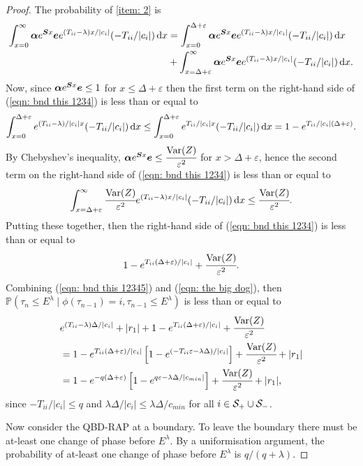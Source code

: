 \begin{proof}
	The probability of \ref{item: 2} is 
	\begin{align}
		\nonumber\int_{x=0}^\infty \boldsymbol \alpha e^{\boldsymbol{S}x}\boldsymbol e e^{(T_{ii}-\lambda)x/|c_i|}(-T_{ii}/|c_i|)\, \mathrm{d} x 
		&= \int_{x=0}^{\Delta+\varepsilon} \boldsymbol \alpha e^{\boldsymbol{S}x}\boldsymbol ee^{(T_{ii}-\lambda)x/|c_i|}(-T_{ii}/|c_i|)\, \mathrm{d} x 
		\\&{}+\int_{x=\Delta+\varepsilon}^\infty \boldsymbol \alpha e^{\boldsymbol{S}x}\boldsymbol e e^{(T_{ii}-\lambda)x/|c_i|}(-T_{ii}/|c_i|)\, \mathrm{d} x.\label{eqn: bnd this 1234}
	\end{align}
	Now, since \(\boldsymbol \alpha e^{\boldsymbol{S}x}\boldsymbol e\leq 1\) for \(x\leq \Delta+\varepsilon\) then the first term on the right-hand side of (\ref{eqn: bnd this 1234}) is less than or equal to 
	\[\displaystyle \int_{x=0}^{\Delta+\varepsilon} e^{(T_{ii}-\lambda)/|c_i|x}(-T_{ii}/|c_i|)\, \mathrm{d} x \leq \int_{x=0}^{\Delta+\varepsilon} e^{T_{ii}/|c_i|x}(-T_{ii}/|c_i|)\, \mathrm{d} x = 1-e^{T_{ii}/|c_i|(\Delta+\varepsilon)}.\]
	By Chebyshev's inequality, \(\boldsymbol \alpha e^{\boldsymbol{S}x}\boldsymbol e\leq \cfrac{\mathrm{Var}(Z)}{\varepsilon^2}\) for \(x> \Delta+\varepsilon\), hence the second term on the right-hand side of (\ref{eqn: bnd this 1234}) is less than or equal to 
	\[\displaystyle \int_{x=\Delta+\varepsilon}^\infty \cfrac{\mathrm{Var}(Z)}{\varepsilon^2} e^{(T_{ii}-\lambda)x/|c_i|}(-T_{ii}/|c_i|)\, \mathrm{d} x \leq  \cfrac{\mathrm{Var}(Z)}{\varepsilon^2}.\]
	Putting these together, then the right-hand side of (\ref{eqn: bnd this 1234}) is less than or equal to
	\begin{align}
		1-e^{T_{ii}(\Delta+\varepsilon)/|c_i|} + \cfrac{\mathrm{Var}(Z)}{\varepsilon^2}.\label{eqn: the big dog}
	\end{align}	
	Combining (\ref{eqn: bnd this 12345}) and (\ref{eqn: the big dog}), then \(\mathbb P(\tau_n\leq E^\lambda  \mid \phi(\tau_{n-1})=i , \tau_{n-1}\leq  E^\lambda)\) is less than or equal to 
	\begin{align}
		&e^{(T_{ii}-\lambda)\Delta/|c_i|} + |r_1| + 1-e^{T_{ii}(\Delta+\varepsilon)/|c_i|} + \cfrac{\mathrm{Var}(Z)}{\varepsilon^2}\nonumber
		\\&= 1-e^{T_{ii}(\Delta+\varepsilon)/|c_i|}\left[1-e^{(-T_{ii}\varepsilon-\lambda \Delta)/|c_i|}\right] + \cfrac{\mathrm{Var}(Z)}{\varepsilon^2} + |r_1| \nonumber 
		\\&= 1-e^{-q(\Delta+\varepsilon)}\left[1-e^{q\varepsilon-\lambda \Delta/|c_{min}|}\right] + \cfrac{\mathrm{Var}(Z)}{\varepsilon^2} + |r_1|,
	\end{align}
	since \(-T_{ii}/|c_i|\leq q\) and \(\lambda \Delta/|c_i| \leq \lambda \Delta/c_{min}\) for all \(i\in\mathcal S_+\cup \mathcal{S}_-\). 
	
	Now consider the QBD-RAP at a boundary. To leave the boundary there must be at-least one change of phase before \(E^\lambda\). By a uniformisation argument, the probability of at-least one change of phase before \(E^\lambda\) is \(q/(q+\lambda)\). 
\end{proof}
